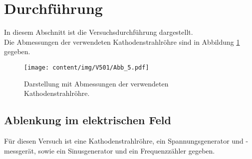 \section{Durchführung}

    In diesem Abschnitt ist die Versuchsdurchführung dargestellt.\\
    Die Abmessungen der verwendeten Kathodenstrahlröhre sind in Abbildung \ref{fig:abmessungen} gegeben.
    \begin{figure}[H]
        \centering
        \texttt{[image: content/img/V501/Abb\_5.pdf]}
        \caption{Darstellung mit Abmessungen der verwendeten Kathodenstrahlröhre.}
        \label{fig:abmessungen}
    \end{figure}

\subsection{Ablenkung im elektrischen Feld}

    Für diesen Versuch ist eine Kathodenstrahlröhre,
    ein Spannungsgenerator und -messgerät,
    sowie ein Sinusgenerator und ein Frequenzzähler gegeben.\\
   
